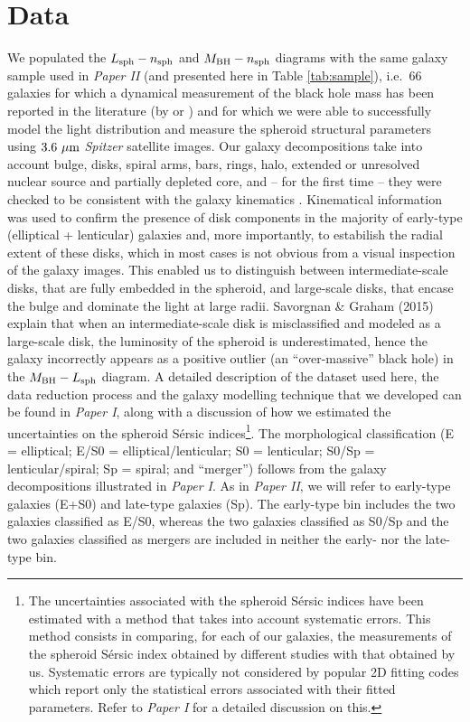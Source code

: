 \documentclass[preprint2]{emulateapj}
\begin{document}
\section{Data}
We populated the $L_{\rm sph} - n_{\rm sph}$ and $M_{\rm BH} - n_{\rm sph}$ diagrams 
with the same galaxy sample used in \emph{Paper II} (and presented here in Table \ref{tab:sample}), 
i.e.~66 galaxies for which a dynamical measurement of the black hole mass has been reported in the literature 
(by \citealt{grahamscott2013} or \citealt{rusli2013}) 
and for which we were able to successfully model the light distribution and measure the spheroid structural parameters 
using $3.6\rm~\mu m$ \emph{Spitzer} satellite images. 
Our galaxy decompositions take into account bulge, disks, spiral arms, bars, rings, halo, 
extended or unresolved nuclear source and partially depleted core, 
and -- for the first time -- they were checked to be consistent with the galaxy kinematics 
\citep{atlas3dIII,scott2014,arnold2014}. 
Kinematical information was used to confirm the presence of disk components 
in the majority of early-type (elliptical + lenticular) galaxies and, more importantly,  
to estabilish the radial extent of these disks, 
which in most cases is not obvious from a visual inspection of the galaxy images. 
This enabled us to distinguish between intermediate-scale disks, 
that are fully embedded in the spheroid,  
and large-scale disks, that encase the bulge and dominate the light at large radii.  
Savorgnan \& Graham (2015) explain that when an intermediate-scale disk is misclassified and modeled as a large-scale disk, 
the luminosity of the spheroid is underestimated, 
hence the galaxy incorrectly appears as a positive outlier (an ``over-massive'' black hole) in the $M_{\rm BH} - L_{\rm sph}$ diagram. 
A detailed description of the dataset used here, the data reduction process and the galaxy modelling technique that we developed 
can be found in \emph{Paper I}, 
along with a discussion of how we estimated the uncertainties on the spheroid S\'ersic indices\footnote{The uncertainties associated with 
the spheroid S\'ersic indices have been estimated with a method that takes into account systematic errors. 
This method consists in comparing, for each of our galaxies, the measurements of the spheroid S\'ersic index obtained by different studies 
with that obtained by us. 
Systematic errors are typically not considered by popular 2D fitting codes which report only the statistical errors 
associated with their fitted parameters. 
Refer to \emph{Paper I} for a detailed discussion on this. }.  
The morphological classification (E = elliptical; E/S0 = elliptical/lenticular; S0 = lenticular; 
S0/Sp = lenticular/spiral; Sp = spiral; and ``merger'') follows from the galaxy decompositions illustrated in \emph{Paper I}. 
As in \emph{Paper II}, we will refer to early-type galaxies (E+S0) and late-type galaxies (Sp). 
The early-type bin includes the two galaxies classified as E/S0, 
whereas the two galaxies classified as S0/Sp and the two galaxies classified as mergers are included in neither the early- nor the late-type bin.
\end{document}
